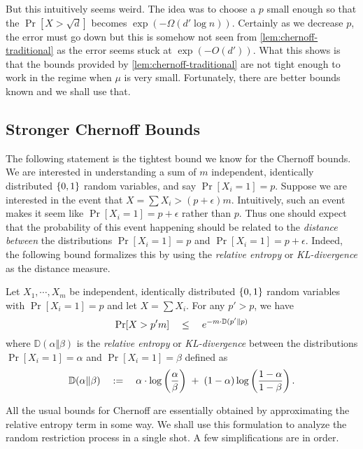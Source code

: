 But this intuitively seems weird.
The idea was to choose a $p$ small enough so that the $\Pr[X > \sqrt{d}]$ becomes $\exp(-\Omega(d' \log n))$.
Certainly as we decrease $p$, the error must go down but this is somehow not seen from \autoref{lem:chernoff-traditional} as the error seems stuck at $\exp(-O(d'))$.
What this shows is that the bounds provided by \autoref{lem:chernoff-traditional} are not tight enough to work in the regime when $\mu$ is very small. Fortunately, there are better bounds known and we shall use that. 

\subsection{Stronger Chernoff Bounds}

The following statement is the tightest bound we know for the Chernoff bounds.
We are interested in understanding a sum of $m$ independent, identically distributed $\left\{0,1\right\}$ random variables, and say $\Pr[X_i = 1] = p$.
Suppose we are interested in the event that $X = \sum X_i > (p + \epsilon)m$.
Intuitively, such an event makes it seem like $\Pr[X_i = 1] = p+\epsilon$ rather than $p$.
Thus one should expect that the probability of this event happening should be related to the \emph{distance between} the distributions $\Pr[X_i=1]= p$ and $\Pr[X_i = 1] = p+\epsilon$. Indeed, the following bound formalizes this by using the \emph{relative entropy} or \emph{KL-divergence} as the distance measure. 

\begin{lemma}\label{lem:chernoff-stronger}
Let $X_1,\cdots, X_m$ be independent, identically distributed $\left\{0,1\right\}$ random variables with $\Pr[X_i = 1] = p$ and let $X = \sum X_i$. For any $p' > p$, we have
\[
\Pr[X >p' m] \quad \leq \quad e^{-m \cdot \mathbb{D}(p' \Vert p)}
\]
where $\mathbb{D}(\alpha \Vert \beta)$ is the \emph{relative entropy} or \emph{KL-divergence} between the distributions $\Pr[X_i=1] = \alpha$ and $\Pr[X_i=1]=\beta$ defined as
\[
\mathbb{D}(\alpha \Vert \beta) \quad := \quad \alpha \cdot \log \left(\frac{\alpha}{\beta}\right) \;+\; (1 - \alpha) \log \left(\frac{1-\alpha}{1- \beta}\right).
\]
\end{lemma}

All the usual bounds for Chernoff are essentially obtained by approximating the relative entropy term in some way. We shall use this formulation to analyze the random restriction process in a single shot. A few simplifications are in order. 

